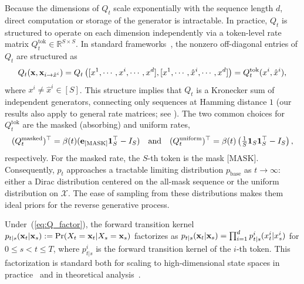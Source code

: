 \documentclass{article} %
\def\eqref#1{equation~\ref{#1}}
\newcommand{\bfe}{{\bf e}}
\newcommand{\bfx}{{\bf x}}
\newcommand{\mask}{\text{[MASK]}}
\newcommand{\xito}{\mathbf{x}_{i \to \hat{x}^i}}
\renewcommand{\eqref}[1]{\textup{(\ref{#1})}}
\begin{document}
Because the dimensions of $Q_t$ scale exponentially with the sequence length $d$, direct computation or storage of the generator is intractable. In practice, $Q_t$ is structured to operate on each dimension independently via a token-level rate matrix $Q_t^\mathrm{tok} \in \mathbb{R}^{S \times S}$. In standard frameworks~\citep{campbell2022continuous,lou2024discrete,zhang2025convergence}, the nonzero off-diagonal entries of $Q_t$ are structured as 
\newcommand{\Qfactoreq}{Q_t(\bfx, \xito) = Q_t \left( [x^1, \dotsm, x^i, \dotsm, x^d], [x^1, \dotsm, \hat{x}^i, \dotsm, x^d] \right) = Q_t^\mathrm{tok}(x^i, \hat{x}^i),}
\begin{equation}\label{eq:Q_factor}
    \Qfactoreq
\end{equation}
where $x^i \neq \hat{x}^i \in [S]$.
This structure implies that $Q_t$ is a Kronecker sum of independent generators, connecting only sequences at Hamming distance $1$ (our results also apply to general rate matrices; see ). The two common choices for $Q_t^\mathrm{tok}$ are the masked (absorbing) and uniform rates,
\newcommand{\Qabsorbunieq}{(Q_t^{\rm masked})^\top = \beta(t) ( \bfe_{\mask} \mathbf{1}_S^\top - I_S) \quad \text{and} \quad (Q_t^{\rm uniform})^\top = \beta(t) \left(\tfrac{1}{S} \mathbf{1}_S \mathbf{1}_S^\top - I_S \right),}
\begin{equation}\label{eq:Q_absorb_uni}
    \Qabsorbunieq
\end{equation}
respectively. For the masked rate, the $S$-th token is the mask $\mask$. Consequently, $p_t$ approaches a tractable limiting distribution $p_{\mathrm{base}}$ as $t \to \infty$: either a Dirac distribution centered on the all-mask sequence or the uniform distribution on $\mathcal{X}$. The ease of sampling from these distributions makes them ideal priors for the reverse generative process.
 
Under~\eqref{eq:Q_factor}, the forward transition kernel $p_{t|s}(\bfx_t|\bfx_s):=\Pr(X_t=\bfx_t| X_s=\bfx_s)$ factorizes as $p_{t|s}(\bfx_t|\bfx_s)=\prod_{i=1}^d p^i_{t|s}(x_t^i|x_s^i)$ for $0 \leq s < t \leq T$, where $p^i_{t|s}$ is the forward transition kernel of the $i$-th token. This factorization is standard both for scaling to high-dimensional state spaces in practice~\citep{austin2021structured,campbell2022continuous,campbell2024generative,lou2024discrete} and in theoretical analysis~\citep{zhao2025unified,chen2025convergence,zhang2025convergence,ren2025discrete}.
 
\end{document}

